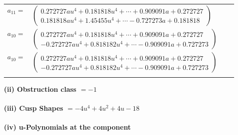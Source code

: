 \documentclass[1p]{elsarticle_modified}
\theoremstyle{definition}
\begin{document}
\begin{tabular}{m{7pt} m{180pt} m{7pt} m{180pt} }
\flushright $a_{11}=$&$\begin{pmatrix}0.272727 a u^{4}+0.181818 u^{4}+\cdots+0.909091 a+0.272727\\0.181818 a u^{4}+1.45455 u^{4}+\cdots-0.727273 a+0.181818\end{pmatrix}$ \\
\flushright $a_{10}=$&$\begin{pmatrix}0.272727 a u^{4}+0.181818 u^{4}+\cdots+0.909091 a+0.272727\\-0.272727 a u^{4}+0.818182 u^{4}+\cdots-0.909091 a+0.727273\end{pmatrix}$\\ \flushright $a_{10}=$&$\begin{pmatrix}0.272727 a u^{4}+0.181818 u^{4}+\cdots+0.909091 a+0.272727\\-0.272727 a u^{4}+0.818182 u^{4}+\cdots-0.909091 a+0.727273\end{pmatrix}$\\&\end{tabular}
\flushleft \textbf{(ii) Obstruction class $= -1$}\\~\\
\flushleft \textbf{(iii) Cusp Shapes $= -4 u^4+4 u^2+4 u-18$}\\~\\
\newpage\renewcommand{\arraystretch}{1}
\flushleft \textbf{(iv) u-Polynomials at the component}\newline \\
\end{document}
